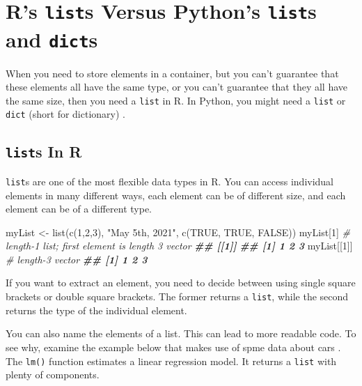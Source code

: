 \documentclass[
  12pt,
  krantz2]{krantz}
\makeatletter
\newenvironment{Shaded}{\begin{snugshade}}{\end{snugshade}}
\newcommand{\CommentTok}[1]{\textcolor[rgb]{0.37,0.37,0.37}{\textit{#1}}}
\newcommand{\ConstantTok}[1]{\textcolor[rgb]{0,0,0}{#1}}
\newcommand{\DecValTok}[1]{\textcolor[rgb]{0.06,0.06,0.06}{#1}}
\newcommand{\DocumentationTok}[1]{\textcolor[rgb]{0.37,0.37,0.37}{\textbf{\textit{#1}}}}
\newcommand{\FunctionTok}[1]{\textcolor[rgb]{0,0,0}{#1}}
\newcommand{\NormalTok}[1]{#1}
\newcommand{\OtherTok}[1]{\textcolor[rgb]{0.37,0.37,0.37}{#1}}
\newcommand{\StringTok}[1]{\textcolor[rgb]{0.5,0.5,0.5}{#1}}
\newenvironment{kframe}{%
\medskip{}
\setlength{\fboxsep}{.8em}
 \def\at@end@of@kframe{}%
 \ifinner\ifhmode%
  \def\at@end@of@kframe{\end{minipage}}%
  \begin{minipage}{\columnwidth}%
 \fi\fi%
 \def\FrameCommand##1{\hskip\@totalleftmargin \hskip-\fboxsep
 \colorbox{shadecolor}{##1}\hskip-\fboxsep
     \hskip-\linewidth \hskip-\@totalleftmargin \hskip\columnwidth}%
 \MakeFramed {\advance\hsize-\width
   \@totalleftmargin\z@ \linewidth\hsize
   \@setminipage}}%
 {\par\unskip\endMakeFramed%
 \at@end@of@kframe}
\renewenvironment{Shaded}{\begin{kframe}}{\end{kframe}}
\makeatother
\begin{document}
\hypertarget{rs-lists-versus-pythons-lists-and-dicts}{%
\chapter{\texorpdfstring{R's \texttt{list}s Versus Python's \texttt{list}s and \texttt{dict}s}{R's lists Versus Python's lists and dicts}}\label{rs-lists-versus-pythons-lists-and-dicts}}

When you need to store elements in a container, but you can't guarantee that these elements all have the same type, or you can't guarantee that they all have the same size, then you need a \texttt{list} in R. In Python, you might need a \texttt{list} or \texttt{dict}  (short for dictionary) \citep{Lutz13}.

\hypertarget{lists-in-r}{%
\section{\texorpdfstring{\texttt{list}s In R}{lists In R}}\label{lists-in-r}}

\texttt{list}s are one of the most flexible data types in R. You can access individual elements in many different ways, each element can be of different size, and each element can be of a different type.

\begin{Shaded}
\begin{Highlighting}[]
\NormalTok{myList }\OtherTok{\textless{}{-}} \FunctionTok{list}\NormalTok{(}\FunctionTok{c}\NormalTok{(}\DecValTok{1}\NormalTok{,}\DecValTok{2}\NormalTok{,}\DecValTok{3}\NormalTok{), }\StringTok{"May 5th, 2021"}\NormalTok{, }\FunctionTok{c}\NormalTok{(}\ConstantTok{TRUE}\NormalTok{, }\ConstantTok{TRUE}\NormalTok{, }\ConstantTok{FALSE}\NormalTok{))}
\NormalTok{myList[}\DecValTok{1}\NormalTok{] }\CommentTok{\# length{-}1 list; first element is length 3 vector}
\DocumentationTok{\#\# [[1]]}
\DocumentationTok{\#\# [1] 1 2 3}
\NormalTok{myList[[}\DecValTok{1}\NormalTok{]] }\CommentTok{\# length{-}3 vector}
\DocumentationTok{\#\# [1] 1 2 3}
\end{Highlighting}
\end{Shaded}

If you want to extract an element, you need to decide between using single square brackets or double square brackets. The former returns a \texttt{list}, while the second returns the type of the individual element.

You can also name the elements of a list. This can lead to more readable code. To see why, examine the example below that makes use of spme data about cars \citep{sas_cars}. The \texttt{lm()} function estimates a linear regression model. It returns a \texttt{list} with plenty of components.
\end{document}
